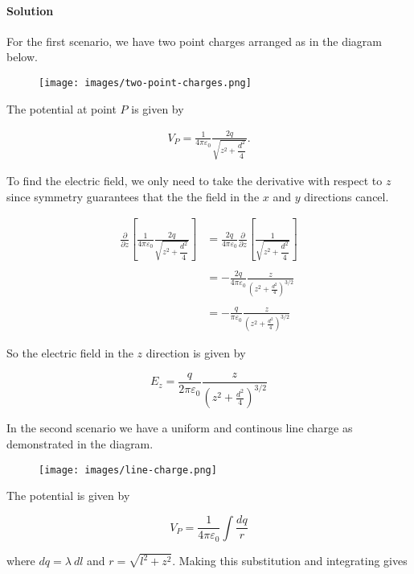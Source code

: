 \documentclass{article}
\newcommand{\delz}{\frac{\partial}{\partial z}}
\begin{document}
\paragraph{Solution}
For the first scenario, we have two point charges arranged as in the diagram below. 

\begin{figure}[h]
    \centering
    \texttt{[image: images/two-point-charges.png]}
\end{figure}

The potential at point $P$ is given by 

\begin{align*}
    V_P = \frac{1}{4\pi \varepsilon_0} \frac{2q}{\sqrt{z^2 + \dfrac{d^2}{4}}}.
\end{align*}

To find the electric field, we only need to take the derivative with respect to $z$ since symmetry guarantees that the the field in the $x$ and $y$ directions cancel. 

\begin{align*}
    \delz\left[ \frac{1}{4\pi \varepsilon_0} \frac{2q}{\sqrt{z^2 + \dfrac{d^2}{4}}} \right] &= \frac{2q}{4\pi \varepsilon_0} \delz \left[\frac{1}{\sqrt{z^2 + \dfrac{d^2}{4}}} \right] \\
    \\
    &= -\frac{2q}{4\pi \varepsilon_0} \frac{z}{\left(z^2 + \frac{d^2}{4}\right)^{3/2}} \\
    \\
    &= -\frac{q}{\pi \varepsilon_0}\frac{z}{{\left(z^2 + \frac{d^2}{4}\right)^{3/2}}}
\end{align*}

So the electric field in the $z$ direction is given by 

$$
E_z =  \frac{q}{2\pi \varepsilon_0}\frac{z}{{\left(z^2 + \frac{d^2}{4}\right)^{3/2}}}
$$

In the second scenario we have a uniform and continous line charge as demonstrated in the diagram. 

\begin{figure}[h]
    \centering
    \texttt{[image: images/line-charge.png]}
\end{figure}

The potential is given by 

$$V_P = \frac{1}{4\pi \varepsilon_0} \int \frac{dq}{r}$$

where $dq = \lambda \ dl$ and $r = \sqrt{l^2 + z^2}$. Making this substitution and integrating gives 
\end{document}

